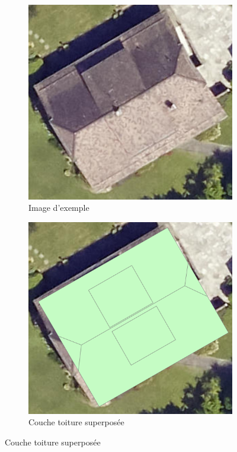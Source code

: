 \begin{figure}[H]
    \centering
    
    \begin{subfigure}[b]{0.475\textwidth}
        \centering
        \includegraphics[width=\textwidth]{02-main/figures/ch3_piste_exploree_classification_02_image_originale.png}
        \caption{Image d'exemple}
        \label{fig:ch3_piste_exploree_classification_02_image_originale}
    \end{subfigure}
    \hfill
    \begin{subfigure}[b]{0.48\textwidth}
        \centering
        \includegraphics[width=\textwidth]{02-main/figures/ch3_piste_exploree_classification_03_couche_toiture.png}
        \caption{Couche toiture superposée}
        \label{fig:ch3_piste_exploree_classification_03_couche_toiture}
    \end{subfigure}
    

\end{figure}
